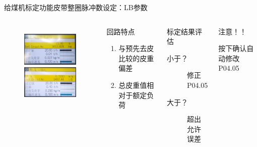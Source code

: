 \documentclass[12pt,hyperref={CJKbookmarks=true}]{beamer} %
\begin{document}
	\begin{frame}{给煤机标定功能}{皮带整圈脉冲数设定：LB参数}
  		\begin{columns}
\begin{figure}
\includegraphics[angle=0,width=150pt,trim=0 0 0 0,clip]{picture/LBing.jpg}\\
\includegraphics[angle=0,width=150pt,trim=0 0 0 0,clip]{picture/LBed.jpg}
	
\end{figure}
\begin{block}{回路特点}
			\begin{enumerate}
				\item  与预先去皮比较的皮重偏差
				\item  总皮重值相对于额定负荷
				\end{enumerate}
\end{block}
\begin{exampleblock}{标定结果评估}
			\begin{description}
				\item[小于？]修正P04.05
				\item[大于？]超出允许误差
				\end{description}
\end{exampleblock}
\begin{alertblock}{注意！！}
			
				按下确认自动修改P04.05
\end{alertblock}
		\end{columns}
	\end{frame}
\end{document}
